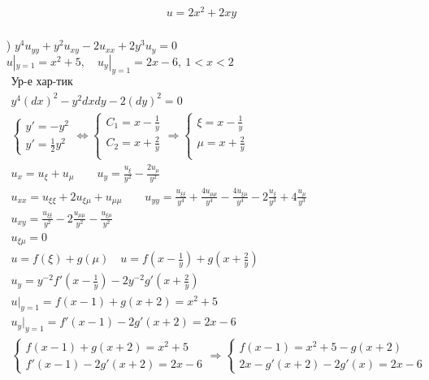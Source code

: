 \begin{enumerate}
\begin{gather*}
    \boxed{u=2x^{2}+2xy} \\
  \end{gather*} \newpage
\item[\text{д})] $y^{4}u_{yy}+y^{2}u_{xy}-2u_{xx}+2y^{3}u_{y}=0$ \\
  $u|_{y=1}=x^{2}+5, \quad u_{y}|_{y=1}=2x-6, \ 1<x<2$ \\
  \begin{gather*}
    \text{Ур-е хар-тик} \\
    y^{4}(dx)^{2}-y^{2}dxdy-2(dy)^{2}=0 \\
    \begin{cases}
      y' = -y^{2} \\ y' =\frac{1}{2}y^{2} 
    \end{cases} \Leftrightarrow
    \begin{cases}
      C_{1} = x - \frac{1}{y} \\ C_{2} = x + \frac{2}{y} \\
    \end{cases} \Rightarrow
    \begin{cases}
      \xi = x - \frac{1}{y} \\ \mu = x + \frac{2}{y} \\
    \end{cases} \\
  u_{x} = u_{\xi} +u_{\mu} \qquad u_{y} = \frac{u_{\xi}}{y^{2}} - \frac{2u_{\mu}}{y^{2}} \\
  u_{xx}=u_{\xi\xi}+2u_{\xi\mu}+u_{\mu\mu} \qquad u_{yy}= \frac{u_{\xi\xi}}{y^{4}}+ \frac{4u_{\mu\mu}}{y^{4}}
  - \frac{4u_{\xi\mu}}{y^{4}}-2 \frac{u_{\xi}}{y^{3}}+ 4 \frac{u_{\mu}}{y^{3}} \\
  u_{xy}= \frac{u_{\xi\xi}}{y^{2}} - 2 \frac{u_{\mu\mu}}{y^{2}} - \frac{u_{\xi\mu}}{y^{2}} \\
  u_{\xi\mu} = 0 \\
  u = f(\xi)+g(\mu) \quad u = f(x - \frac{1}{y})+g(x+ \frac{2}{y}) \\
  u_{y}=y^{-2}f'(x- \frac{1}{y})-2y^{-2}g'(x+ \frac{2}{y}) \\
  u|_{y=1}=f(x-1)+g(x+2)=x^{2}+5 \\ u_{y}|_{y=1}=f'(x-1)-2g'(x+2)=2x-6 \\
  \begin{cases}
    f(x-1)+g(x+2)=x^{2}+5 \\ f'(x-1)-2g'(x+2)=2x-6
  \end{cases} \Rightarrow \begin{cases}
    f(x-1) = x^{2}+5-g(x+2) \\ 2x-g'(x+2)-2g'(x)=2x-6

\end{cases}
\end{gather*}
\end{enumerate}
